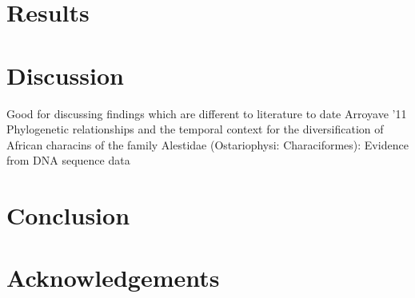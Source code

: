\documentclass[12pt]{article}
\begin{document}
\newpage
\section{Results}


\newpage
\section{Discussion}
Good for discussing findings which are different to literature to date Arroyave '11 Phylogenetic relationships and the temporal context for the diversification
of African characins of the family Alestidae (Ostariophysi: Characiformes): Evidence
from DNA sequence data

\newpage
\section{Conclusion}
\newpage

\section{Acknowledgements}


\end{document}
